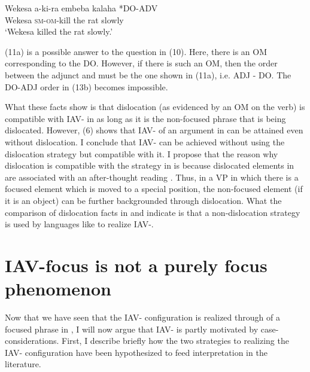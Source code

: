 \documentclass[output=paper
,newtxmath
,modfonts
,nonflat]{langsci/langscibook}
\begin{document}
\ex\label{ex:selvanathan:11b}
\gll *Wekesa  a-ki-ra   embeba  kalaha        *DO-ADV\\
Wekesa  \textsc{sm}{}-\textsc{om}{}-kill  {the rat}    slowly\\
\glt `Wekesa killed the rat slowly.'
\z
\z

(11a) is a possible answer to the question in (10). Here, there is an OM corresponding to the DO. However, if there is such an OM, then the order between the adjunct and  must be the one shown in (11a), i.e. ADJ - DO. The DO-ADJ order in (13b) becomes impossible.   

What these facts show is that dislocation (as evidenced by an OM on the verb) is compatible with IAV- in  as long as it is the non-focused phrase that is being dislocated. However, (6) shows that IAV- of an argument in  can be attained even without dislocation. I conclude that  IAV- can be achieved without using the dislocation strategy but compatible with it. I propose that the reason why dislocation is compatible with the  strategy in  is because dislocated elements in  are associated with an after-thought reading \citep{Diercks2013}. Thus, in a VP in which there is a focused element which is moved to a special position, the non-focused element (if it is an object) can be further backgrounded through dislocation. What the comparison of dislocation facts in  and  indicate is that a non-dislocation strategy is used by languages like  to realize IAV-.

\section{ IAV-focus is not a purely focus phenomenon}

Now that we have seen that the IAV- configuration is realized through  of a focused phrase in , I will now argue that  IAV- is partly motivated by case-considerations. First, I describe briefly how the two strategies to realizing the IAV- configuration have been hypothesized to feed  interpretation in the literature.
\end{document}
